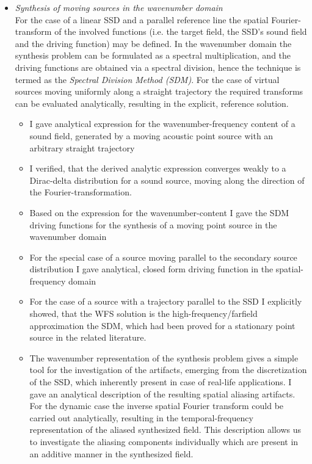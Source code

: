 \documentclass[a4paper,10pt]{article}
\begin{document}
\begin{itemize}
\item \emph{Synthesis of moving sources in the wavenumber domain\\}
For the case of a linear SSD and a parallel reference line the spatial Fourier-transform of the involved functions (i.e. the target field, the SSD's sound field and the driving function) may be defined.
In the wavenumber domain the synthesis problem can be formulated as a spectral multiplication, and the driving functions are obtained via a spectral division, hence the technique is termed as the \emph{Spectral Division Method (SDM)}.
For the case of virtual sources moving uniformly along a straight trajectory the required transforms can be evaluated analytically, resulting in the explicit, reference solution.
	\begin{itemize}
	\item I gave analytical expression for the wavenumber-frequency content of a sound field, generated by a moving acoustic point source with an arbitrary straight trajectory
	\item I verified, that the derived analytic expression converges weakly to a Dirac-delta distribution for a sound source, moving along the direction of the Fourier-transformation.
	\item Based on the expression for the wavenumber-content I gave the SDM driving functions for the synthesis of a moving point source in the wavenumber domain
	\item For the special case of a source moving parallel to the secondary source distribution I gave analytical, closed form driving function in the spatial-frequency domain
	\item For the case of a source with a trajectory parallel to the SSD I explicitly showed, that the WFS solution is the high-frequency/farfield approximation the SDM, which had been proved for a stationary point source in the related literature.
	\item The wavenumber representation of the synthesis problem gives a simple tool for the investigation of the artifacts, emerging from the discretization of the SSD, which inherently present in case of real-life applications.
	I gave an analytical description of the resulting spatial aliasing artifacts.
	For the dynamic case the inverse spatial Fourier transform could be carried out analytically, resulting in the temporal-frequency representation of the aliased synthesized field.
	This description allows us to investigate the aliasing components individually which are present in an additive manner in the synthesized field.

\end{itemize}
\end{itemize}
\end{document}
